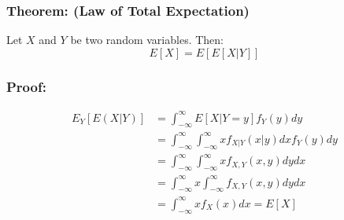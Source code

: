 \documentclass{article}
\begin{document}
\subsubsection{Theorem: (Law of Total Expectation)}
Let $X$ and $Y$ be two random variables. Then:
\begin{equation*}
    E[X] = E[E[X|Y]]
\end{equation*}

\subsubsection*{Proof:}

\begin{equation*}
    \begin{split}
        E_Y[E(X|Y)] &= \int_{-\infty}^\infty E[X|Y=y] f_Y(y) dy\\
            &= \int_{-\infty}^\infty \int_{-\infty}^\infty x f_{X|Y}(x|y) dx f_Y(y) dy\\
            &= \int_{-\infty}^\infty \int_{-\infty}^\infty x f_{X,Y}(x,y) dy dx\\
            &= \int_{-\infty}^\infty x \int_{-\infty}^\infty f_{X,Y}(x,y) dy dx\\
            &= \int_{-\infty}^\infty x f_X(x) dx = E[X]
    \end{split}
\end{equation*}
\end{document}
